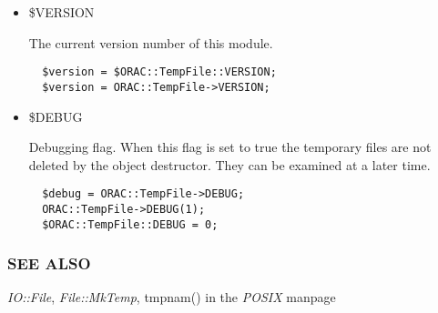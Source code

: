 \begin{itemize}
\item \$VERSION

The current version number of this module.

\begin{verbatim}
  $version = $ORAC::TempFile::VERSION;
  $version = ORAC::TempFile->VERSION;
\end{verbatim}
\item \$DEBUG

Debugging flag. When this flag is set to true the temporary
files are not deleted by the object destructor. They can be
examined at a later time.

\begin{verbatim}
  $debug = ORAC::TempFile->DEBUG;
  ORAC::TempFile->DEBUG(1);
  $ORAC::TempFile::DEBUG = 0;
\end{verbatim}
\end{itemize}
\subsubsection*{SEE ALSO\label{ORAC::TempFile_SEE_ALSO}}

\emph{IO::File}, \emph{File::MkTemp}, \textsf{tmpnam()}
 in the \emph{POSIX} manpage


